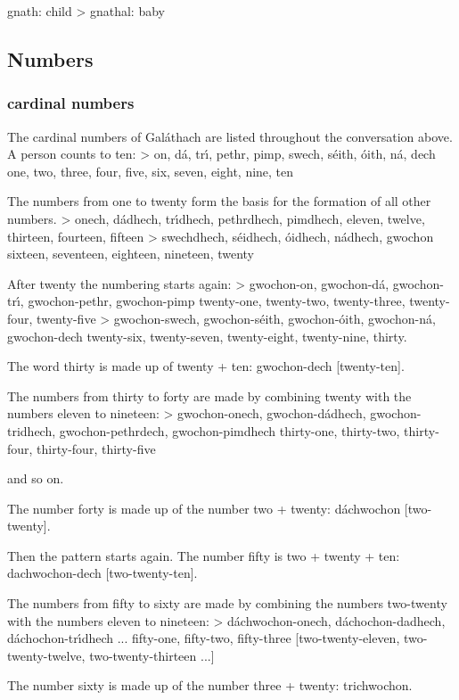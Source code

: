 gnath: child
> gnathal: baby

\subsection{Numbers}
\subsubsection{cardinal numbers}

The cardinal numbers of Gal\'{a}thach are listed throughout the conversation above. A person counts to ten:
> on, d\'{a}, tr\'{\i}, pethr, pimp, swech, s\'{e}ith, \'{o}ith, n\'{a}, dech
one, two, three, four, five, six, seven, eight, nine, ten

The numbers from one to twenty form the basis for the formation of all other numbers.
> onech, d\'{a}dhech, tr\'{\i}dhech, pethrdhech, pimdhech,
eleven, twelve, thirteen, fourteen,  fifteen
> swechdhech, s\'{e}idhech, \'{o}idhech, n\'{a}dhech, gwochon
sixteen,  seventeen, eighteen, nineteen, twenty

After twenty the numbering starts again:
> gwochon-on, gwochon-d\'{a}, gwochon-tr\'{\i}, gwochon-pethr, gwochon-pimp
twenty-one, twenty-two, twenty-three, twenty-four, twenty-five
> gwochon-swech, gwochon-s\'{e}ith, gwochon-\'{o}ith, gwochon-n\'{a}, gwochon-dech
twenty-six, twenty-seven, twenty-eight, twenty-nine, thirty.

The word thirty is made up of twenty + ten: gwochon-dech [twenty-ten].

The numbers from thirty to forty are made by combining twenty with the numbers eleven to nineteen:
> gwochon-onech, gwochon-d\'{a}dhech, gwochon-tridhech, gwochon-pethrdech, gwochon-pimdhech
thirty-one, thirty-two, thirty-four, thirty-four, thirty-five

and so on.

The number forty is made up of the number two + twenty: d\'{a}chwochon [two-twenty].

Then the pattern starts again. The number fifty is two + twenty + ten: dachwochon-dech [two-twenty-ten].

The numbers from fifty to sixty are made by combining the numbers two-twenty with the numbers eleven to nineteen:
> d\'{a}chwochon-onech, d\'{a}chochon-dadhech, d\'{a}chochon-tr\'{\i}dhech ...
fifty-one, fifty-two, fifty-three
[two-twenty-eleven, two-twenty-twelve, two-twenty-thirteen ...]

The number sixty is made up of the number three + twenty: trichwochon.

